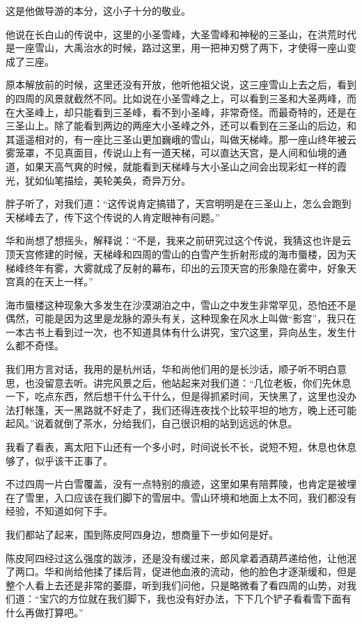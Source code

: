 这是他做导游的本分，这小子十分的敬业。

他说在长白山的传说中，这里的小圣雪峰，大圣雪峰和神秘的三圣山，在洪荒时代是一座雪山，大禹治水的时候，路过这里，用一把神刃劈了两下，才使得一座山变成了三座。

原本解放前的时候，这里还没有开放，他听他祖父说，这三座雪山上去之后，看到的四周的风景就截然不同。比如说在小圣雪峰之上，可以看到三圣和大圣两峰，而在大圣峰上，却只能看到三圣峰，看不到小圣峰，非常奇怪。而最奇特的，还是在三圣山上。除了能看到两边的两座大小圣峰之外，还可以看到在三圣山的后边，和其遥遥相对的，有一座比三圣山更加巍峨的雪山，叫做天梯峰。那一座山终年被云雾笼罩，不见真面目，传说山上有一道天梯，可以直达天宫，是人间和仙境的通道，如果天高气爽的时候，就能看到天梯峰与大小圣山之间会出现彩虹一样的霞光，犹如仙笔描绘，美轮美奂，奇异万分。

胖子听了，对我们道：“这传说肯定搞错了，天宫明明是在三圣山上，怎么会跑到天梯峰去了，传下这个传说的人肯定眼神有问题。”

华和尚想了想摇头，解释说：“不是，我来之前研究过这个传说，我猜这也许是云顶天宫修建的时候，天梯峰和四周的雪山的白雪产生折射形成的海市蜃楼，因为天梯峰终年有雾，大雾就成了反射的幕布，印出的云顶天宫的形象隐在雾中，好象天宫真的在天上一样。”

海市蜃楼这种现象大多发生在沙漠湖泊之中，雪山之中发生非常罕见，恐怕还不是偶然，可能是因为这里是龙脉的源头有关，这种现象在风水上叫做“影宫”，我只在一本古书上看到过一次，也不知道具体有什么讲究，宝穴这里，异向丛生，发生什么都不奇怪。

我们用方言对话，我用的是杭州话，华和尚他们用的是长沙话，顺子听不明白意思，也没留意去听。讲完风景之后，他站起来对我们道：“几位老板，你们先休息一下，吃点东西，然后想干什么干什么，但是得抓紧时间，天快黑了，这里也没办法打帐篷，天一黑路就不好走了，我们还得连夜找个比较平坦的地方，晚上还可能起风。”说着就倒了茶水，分给我们，自己很识相的站到远远的休息。

我看了看表，离太阳下山还有一个多小时，时间说长不长，说短不短，休息也休息够了，似乎该干正事了。

不过四周一片白雪覆盖，没有一点特别的痕迹，这里如果有陪葬陵，也肯定是被埋在了雪里，入口应该在我们脚下的雪层中。雪山环境和地面上太不同，我们都没有经验，不知道如何下手。

我们都站了起来，围到陈皮阿四身边，想商量下一步如何是好。

陈皮阿四经过这么强度的跋涉，还是没有缓过来，郎风拿着酒葫芦递给他，让他泯了两口。华和尚给他揉了揉后背，促进他血液的流动，他的脸色才逐渐缓和，但是整个人看上去还是非常的萎靡，听到我们问他，只是略微看了看四周的山势，对我们道：“宝穴的方位就在我们脚下，我也没有好办法，下下几个铲子看看雪下面有什么再做打算吧。”

